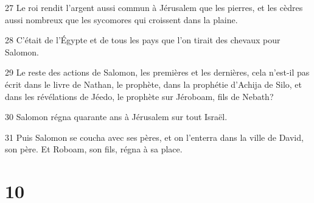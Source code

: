 \par 27 Le roi rendit l'argent aussi commun à Jérusalem que les pierres, et les cèdres aussi nombreux que les sycomores qui croissent dans la plaine.
\par 28 C'était de l'Égypte et de tous les pays que l'on tirait des chevaux pour Salomon.
\par 29 Le reste des actions de Salomon, les premières et les dernières, cela n'est-il pas écrit dans le livre de Nathan, le prophète, dans la prophétie d'Achija de Silo, et dans les révélations de Jéedo, le prophète sur Jéroboam, fils de Nebath?
\par 30 Salomon régna quarante ans à Jérusalem sur tout Israël.
\par 31 Puis Salomon se coucha avec ses pères, et on l'enterra dans la ville de David, son père. Et Roboam, son fils, régna à sa place.

\chapter{10}

